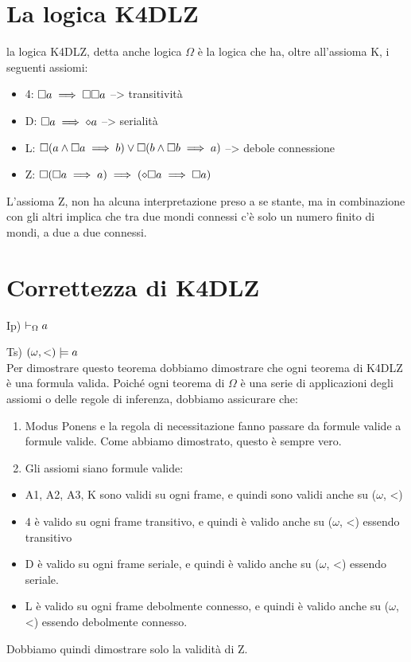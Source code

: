 \section{La logica K4DLZ}

la logica K4DLZ, detta anche logica $\Omega$ è la logica che ha,
oltre all'assioma K, i seguenti assiomi:
\begin{itemize}
\item 4: $\square a\implies\square\square a$ --> transitività
\item D: $\square a\implies\diamond a$ --> serialità
\item L: $\square(a\wedge\square a\implies b)\vee\square(b\wedge\square b\implies a)$
--> debole connessione
\item Z: $\square(\square a\implies a)\implies(\diamond\square a\implies\square a)$
\end{itemize}
L'assioma Z, non ha alcuna interpretazione preso a se stante, ma in
combinazione con gli altri implica che tra due mondi connessi c'è
solo un numero finito di mondi, a due a due connessi.


\section{Correttezza di K4DLZ}

Ip) $\vdash_{\Omega}a$

Ts) $(\omega,<)\models a$\\


Per dimostrare questo teorema dobbiamo dimostrare che ogni teorema
di K4DLZ è una formula valida. Poiché ogni teorema di $\Omega$ è
una serie di applicazioni degli assiomi o delle regole di inferenza,
dobbiamo assicurare che:
\begin{enumerate}
\item Modus Ponens e la regola di necessitazione fanno passare da formule
valide a formule valide. Come abbiamo dimostrato, questo è sempre
vero.
\item Gli assiomi siano formule valide:\end{enumerate}
\begin{itemize}
\item A1, A2, A3, K sono validi su ogni frame, e quindi sono validi anche
su ($\omega$, <)
\item 4 è valido su ogni frame transitivo, e quindi è valido anche su ($\omega$,
<) essendo transitivo
\item D è valido su ogni frame seriale, e quindi è valido anche su ($\omega$,
<) essendo seriale.
\item L è valido su ogni frame debolmente connesso, e quindi è valido anche
su ($\omega$, <) essendo debolmente connesso.\\

\end{itemize}
Dobbiamo quindi dimostrare solo la validità di Z.


